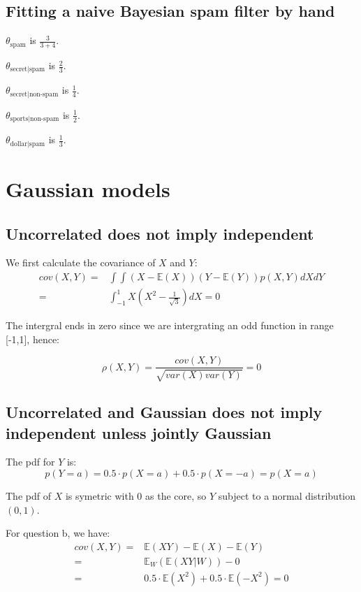 \documentclass[UTF8]{ctexart}
\begin{document}
\subsection{Fitting a naive Bayesian spam filter by hand}
$\theta_{\text{spam}}$ is $\frac{3}{3+4}$.

$\theta_{\text{secret}|\text{spam}}$ is $\frac{2}{3}$.

$\theta_{\text{secret}|\text{non-spam}}$ is $\frac{1}{4}$.

$\theta_{\text{sports}|\text{non-spam}}$ is $\frac{1}{2}$.

$\theta_{\text{dollar}|\text{spam}}$ is $\frac{1}{3}$.

\newpage
\section{Gaussian models}
\subsection{Uncorrelated does not imply independent}
We first calculate the covariance of $X$ and $Y$:
\begin{align}
cov(X,Y)=&\int\int (X-\mathbb{E}(X))(Y-\mathbb{E}(Y)) p(X,Y)dXdY \nonumber \\
=&\int_{-1}^{1}X(X^{2}-\frac{1}{\sqrt{3}})dX=0 \nonumber
\end{align}

The intergral ends in zero since we are intergrating an odd function in range [-1,1], hence:

$$\rho(X,Y)=\frac{cov(X,Y)}{\sqrt{var(X)var(Y)}}=0$$

\subsection{Uncorrelated and Gaussian does not imply independent unless jointly Gaussian}
The pdf for $Y$ is:
$$p(Y=a)=0.5 \cdot p(X=a) + 0.5 \cdot p(X=-a)=p(X=a)$$

The pdf of $X$ is symetric with $0$ as the core, so $Y$ subject to a normal distribution $(0,1)$.

For question b, we have:
\begin{align}
cov(X,Y)=&\mathbb{E}(XY)-\mathbb{E}(X)-\mathbb{E}(Y) \nonumber \\
=& \mathbb{E}_{W}(\mathbb{E}(XY|W)) - 0 \nonumber \\
=&0.5\cdot\mathbb{E}(X^{2})+0.5\cdot\mathbb{E}(-X^{2})=0 \nonumber
\end{align}
\end{document}

